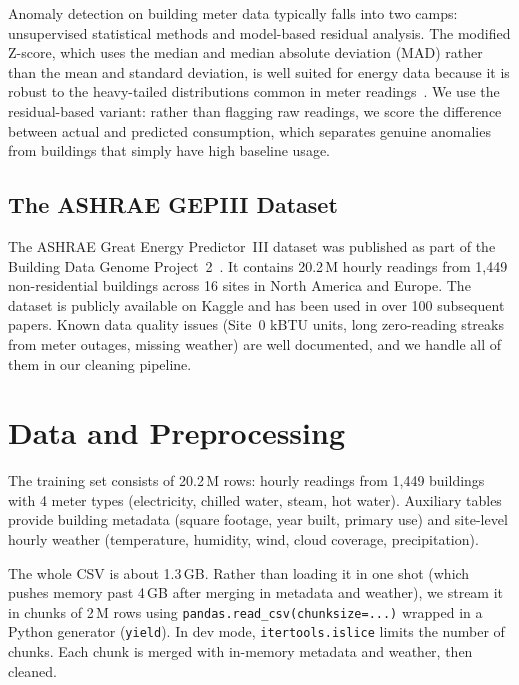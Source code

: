 \documentclass[conference]{IEEEtran}
\begin{document}
Anomaly detection on building meter data typically falls into two camps: unsupervised statistical methods and model-based residual analysis. The modified Z-score, which uses the median and median absolute deviation (MAD) rather than the mean and standard deviation, is well suited for energy data because it is robust to the heavy-tailed distributions common in meter readings~\cite{iglewicz1993}. We use the residual-based variant: rather than flagging raw readings, we score the difference between actual and predicted consumption, which separates genuine anomalies from buildings that simply have high baseline usage.

\subsection{The ASHRAE GEPIII Dataset}

The ASHRAE Great Energy Predictor~III dataset was published as part of the Building Data Genome Project~2~\cite{miller2020}. It contains 20.2\,M hourly readings from 1,449 non-residential buildings across 16 sites in North America and Europe. The dataset is publicly available on Kaggle and has been used in over 100 subsequent papers. Known data quality issues (Site~0 kBTU units, long zero-reading streaks from meter outages, missing weather) are well documented, and we handle all of them in our cleaning pipeline.

\section{Data and Preprocessing}

The training set consists of 20.2\,M rows: hourly readings from 1,449 buildings with 4 meter types (electricity, chilled water, steam, hot water). Auxiliary tables provide building metadata (square footage, year built, primary use) and site-level hourly weather (temperature, humidity, wind, cloud coverage, precipitation).

The whole CSV is about 1.3\,GB. Rather than loading it in one shot (which pushes memory past 4\,GB after merging in metadata and weather), we stream it in chunks of 2\,M rows using \texttt{pandas.read\_csv(chunksize=...)} wrapped in a Python generator (\texttt{yield}). In dev mode, \texttt{itertools.islice} limits the number of chunks. Each chunk is merged with in-memory metadata and weather, then cleaned.
\end{document}
